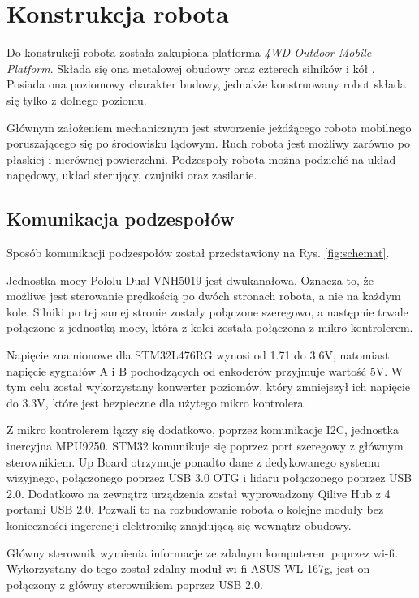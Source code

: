 \chapter{Konstrukcja robota}

Do konstrukcji robota została zakupiona platforma \textit{4WD Outdoor Mobile Platform}. Składa się ona metalowej obudowy oraz czterech silników i kół \cite{Outdoor_robot}. Posiada ona poziomowy charakter budowy, jednakże konstruowany robot składa się tylko z dolnego poziomu. 

Głównym założeniem mechanicznym jest stworzenie jeżdżącego robota mobilnego poruszającego się po środowisku lądowym. Ruch robota jest możliwy zarówno po płaskiej i nierównej powierzchni. Podzespoły robota można podzielić na  układ napędowy, układ sterujący, czujniki oraz zasilanie.



\section{Komunikacja podzespołów}

Sposób komunikacji podzespołów został przedstawiony na Rys. \ref{fig:schemat}. 

Jednostka mocy Pololu Dual VNH5019 jest dwukanałowa. Oznacza to, że możliwe jest sterowanie prędkością po dwóch stronach robota, a nie na każdym kole. Silniki po tej samej stronie zostały połączone szeregowo, a następnie trwale połączone z  jednostką mocy, która z kolei została połączona z mikro kontrolerem. 

Napięcie znamionowe dla STM32L476RG  wynosi od 1.71 do 3.6V, natomiast napięcie sygnałów A i B pochodzących od enkoderów przyjmuje wartość 5V. W tym celu został wykorzystany konwerter poziomów, który zmniejszył ich napięcie do 3.3V, które jest bezpieczne dla użytego mikro kontrolera.

Z mikro kontrolerem łączy się dodatkowo, poprzez komunikacje I2C, jednostka inercyjna MPU9250. STM32 komunikuje się poprzez port szeregowy z głównym sterownikiem. Up Board otrzymuje ponadto dane z dedykowanego systemu wizyjnego, połączonego poprzez USB 3.0 OTG i lidaru połączonego poprzez USB 2.0. Dodatkowo na zewnątrz urządzenia został wyprowadzony Qilive Hub z 4 portami USB 2.0. Pozwali to na rozbudowanie robota o kolejne moduły bez konieczności ingerencji elektronikę znajdującą się wewnątrz obudowy.

Główny sterownik wymienia informacje ze zdalnym komputerem poprzez wi-fi. Wykorzystany do tego został zdalny moduł wi-fi ASUS WL-167g, jest on połączony z główny sterownikiem poprzez USB 2.0.

